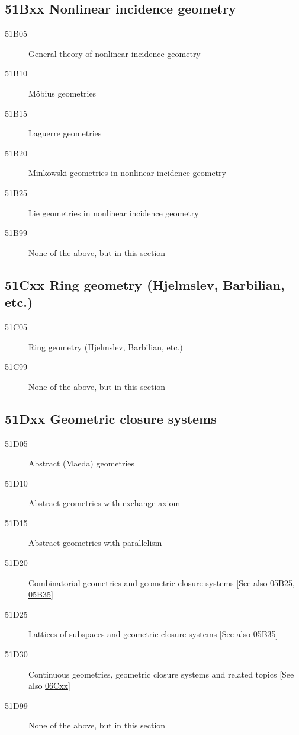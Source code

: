 \subsection*{51Bxx  Nonlinear incidence geometry }\label{51Bxx}
\begin{description}  
\item [51B05]\label{51B05} General theory of nonlinear incidence geometry
\item [51B10]\label{51B10} M\"{o}bius geometries
\item [51B15]\label{51B15} Laguerre geometries
\item [51B20]\label{51B20} Minkowski geometries in nonlinear incidence geometry
\item [51B25]\label{51B25} Lie geometries in nonlinear incidence geometry
\item [51B99]\label{51B99} None of the above, but in this section
\end{description}
\subsection*{51Cxx  Ring geometry (Hjelmslev, Barbilian, etc.) }\label{51Cxx}
\begin{description}  
\item [51C05]\label{51C05} Ring geometry (Hjelmslev, Barbilian, etc.)
\item [51C99]\label{51C99} None of the above, but in this section
\end{description}
\subsection*{51Dxx  Geometric closure systems }\label{51Dxx}
\begin{description}  
\item [51D05]\label{51D05} Abstract (Maeda) geometries
\item [51D10]\label{51D10} Abstract geometries with exchange axiom
\item [51D15]\label{51D15} Abstract geometries with parallelism
\item [51D20]\label{51D20} Combinatorial geometries and geometric closure systems [See also \hyperref[05B25]{05B25}, \hyperref[05B35]{05B35}]
\item [51D25]\label{51D25} Lattices of subspaces and geometric closure systems [See also \hyperref[05B35]{05B35}]
\item [51D30]\label{51D30} Continuous geometries, geometric closure systems and related topics [See also \hyperref[06Cxx]{06Cxx}]
\item [51D99]\label{51D99} None of the above, but in this section
\end{description}
